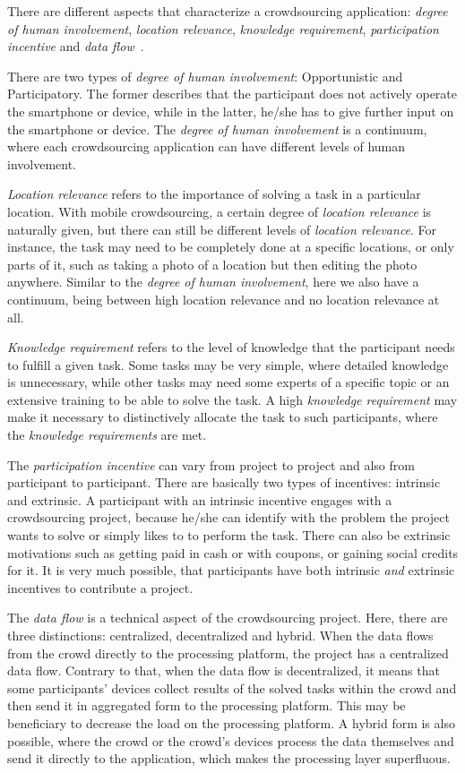 There are different aspects that characterize a crowdsourcing application: \textit{degree of human involvement}, \textit{location relevance}, \textit{knowledge requirement}, \textit{participation incentive} and \textit{data flow}~\cite{ray2023survey,kong2019mobile}.

There are two types of \textit{degree of human involvement}: Opportunistic and Participatory.
The former describes that the participant does not actively operate the smartphone or device, while in the latter, he/she has to give further input on the smartphone or device.
The \textit{degree of human involvement} is a continuum, where each crowdsourcing application can have different levels of human involvement.

\textit{Location relevance} refers to the importance of solving a task in a particular location.
With mobile crowdsourcing, a certain degree of \textit{location relevance} is naturally given, but there can still be different levels of \textit{location relevance}.
For instance, the task may need to be completely done at a specific locations, or only parts of it, such as taking a photo of a location but then editing the photo anywhere.
Similar to the \textit{degree of human involvement}, here we also have a continuum, being between high location relevance and no location relevance at all.

\textit{Knowledge requirement} refers to the level of knowledge that the participant needs to fulfill a given task.
Some tasks may be very simple, where detailed knowledge is unnecessary, while other tasks may need some experts of a specific topic or an extensive training to be able to solve the task.
A high \textit{knowledge requirement} may make it necessary to distinctively allocate the task to such participants, where the \textit{knowledge requirements} are met.

The \textit{participation incentive} can vary from project to project and also from participant to participant.
There are basically two types of incentives: intrinsic and extrinsic.
A participant with an intrinsic incentive engages with a crowdsourcing project, because he/she can identify with the problem the project wants to solve or simply likes to to perform the task.
There can also be extrinsic motivations such as getting paid in cash or with coupons, or gaining social credits for it.
It is very much possible, that participants have both intrinsic \textit{and} extrinsic incentives to contribute a project.

The \textit{data flow} is a technical aspect of the crowdsourcing project.
Here, there are three distinctions: centralized, decentralized and hybrid.
When the data flows from the crowd directly to the processing platform, the project has a centralized data flow.
Contrary to that, when the data flow is decentralized, it means that some participants' devices collect results of the solved tasks within the crowd and then send it in aggregated form to the processing platform.
This may be beneficiary to decrease the load on the processing platform.
A hybrid form is also possible, where the crowd or the crowd's devices process the data themselves and send it directly to the application, which makes the processing layer superfluous. 

